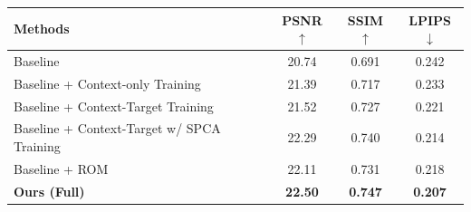 \setlength{\tabcolsep}{6pt}
\renewcommand{\arraystretch}{1.2}

\begin{tabular}{l | ccc}
\toprule
Methods & PSNR$\uparrow$ & SSIM$\uparrow$ & LPIPS$\downarrow$ \\
\midrule
Baseline  & 20.74 & 0.691 & 0.242 \\
Baseline + Context-only Training & 21.39 & 0.717 & 	0.233 \\
Baseline + Context-Target Training & 21.52 & 0.727 & 0.221 \\
Baseline + Context-Target w/ SPCA Training & 22.29 & 0.740 & 0.214 \\
Baseline + ROM & 22.11 & 0.731 & 0.218 \\
\textbf{Ours (Full)} & \textbf{22.50} & \textbf{0.747} & \textbf{0.207} \\
\bottomrule
\end{tabular}